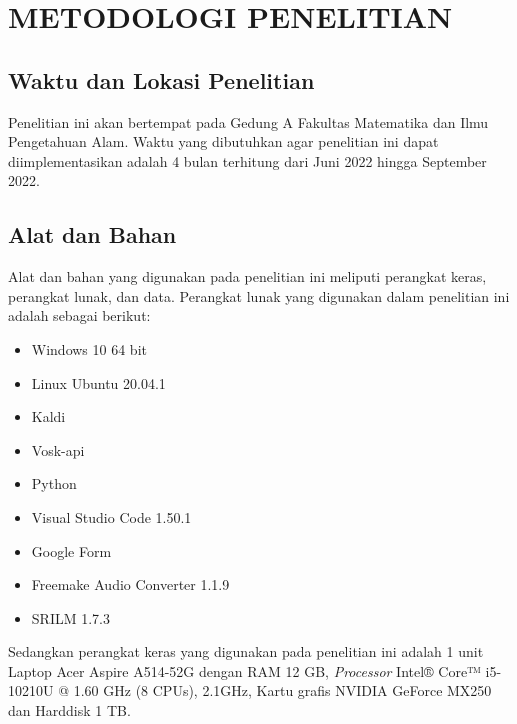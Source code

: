 \fancyhf{} 
\fancyfoot[C]{\thepage}
\chapter{METODOLOGI PENELITIAN}

\section{Waktu dan Lokasi Penelitian}
Penelitian ini akan bertempat pada Gedung A Fakultas Matematika dan Ilmu Pengetahuan Alam. Waktu yang dibutuhkan agar penelitian ini dapat diimplementasikan adalah 4 bulan terhitung dari Juni 2022 hingga September 2022.

\section{Alat dan Bahan}
Alat dan bahan yang digunakan pada penelitian ini meliputi perangkat keras, perangkat lunak, dan data. Perangkat lunak yang digunakan dalam penelitian ini adalah sebagai berikut:

\begin{itemize}
	\item Windows 10 64 bit
	\item Linux Ubuntu 20.04.1
	\item Kaldi
	\item Vosk-api
	\item Python 
	\item Visual Studio Code 1.50.1
	\item Google Form
	\item Freemake Audio Converter 1.1.9
	\item SRILM 1.7.3
\end{itemize}

\par Sedangkan perangkat keras yang digunakan pada penelitian ini adalah 1 unit Laptop Acer Aspire A514-52G dengan RAM 12 GB, \textit{Processor} Intel® Core™ i5-10210U @ 1.60 GHz (8 CPUs), 2.1GHz, Kartu grafis NVIDIA GeForce MX250 dan Harddisk 1 TB. 

